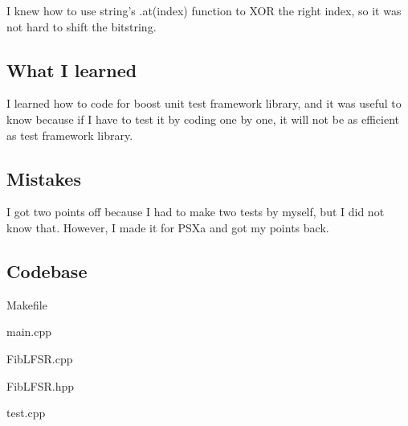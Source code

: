 I knew how to use string's .at(index) function to XOR the right index, so it was not hard to shift the bitstring.

\subsection{What I learned}\label{sec:ps1a:learned}

I learned how to code for boost unit test framework library, and it was useful to know because if I have to test it by coding one by one, it will not be as efficient as test framework library.


\subsection{Mistakes}\label{sec:ps1a:mistakes}

I got two points off because I had to make two tests by myself, but I did not know that. However, I made it for PSXa and got my points back.

\subsection{Codebase}\label{sec:ps1a:code}
Makefile

main.cpp

FibLFSR.cpp

FibLFSR.hpp

test.cpp


\newpage
